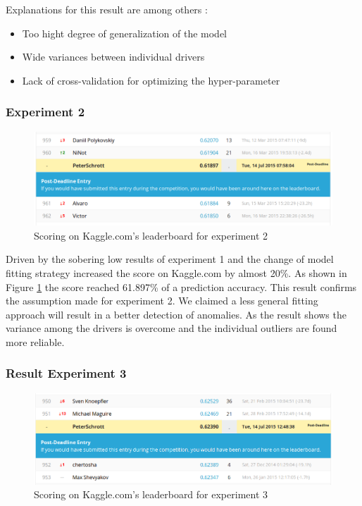 \documentclass{vldb}
\begin{document}
Explanations for this result are among others :
\begin{itemize}
\item Too hight degree of generalization of the model
\item Wide variances between individual drivers
\item Lack of cross-validation for optimizing the hyper-pa\-ra\-me\-ter
\end{itemize}

\subsubsection*{Experiment 2}
\label{ssubsec:Res-e2}

\begin{figure}
\centering
\includegraphics[width=\linewidth]{"pics/kaggle-result-2"}
\caption{Scoring on Kaggle.com's leaderboard for experiment 2}
\label{fig:kaggle-result2}
\end{figure}

Driven by the sobering low results of experiment 1 and the change of model fitting strategy increased the score on Kaggle.com by almost 20\%. As shown in Figure \ref{fig:kaggle-result2} the score reached 61.897\% of a prediction accuracy. This result confirms the assumption made for experiment 2. We claimed a less general fitting approach will result in a better detection of anomalies. As the result shows the variance among the drivers is overcome and the individual outliers are found more reliable.

\subsubsection*{Result Experiment 3}
\label{ssubsec:Res-e3}

\begin{figure}
\centering
\includegraphics[width=\linewidth]{"pics/kaggle-result-3"}
\caption{Scoring on Kaggle.com's leaderboard for experiment 3}
\label{fig:kaggle-result3}
\end{figure}
 
\end{document}
